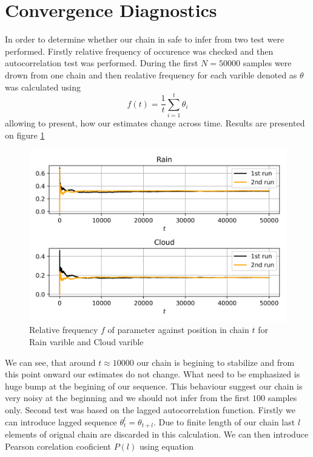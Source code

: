 \documentclass[12pt,a4paper]{article}
\begin{document}
\section{Convergence Diagnostics}
In order to determine whether our chain in safe to infer from two test were performed. Firstly relative frequency of occurence was checked and then 
autocorrelation test was performed. During the first $N=50000$ samples were drown from one chain and then realative frequency for each varible denoted as $\theta$ was calculated using
\begin{equation*}
    f(t)=\frac{1}{t}\sum_{i=1}^{t}\theta_i
\end{equation*} allowing to present, how our estimates change across time. Results are presented on figure \ref{plot_5}
\begin{figure}[H]
    \begin{center}
    \includegraphics{plot_5.png}
    \end{center}
    \caption{Relative frequency $f$ of parameter against position in chain $t$ for Rain varible and Cloud varible}\label{plot_5}
\end{figure}
We can see, that around $t\approx 10000$ our chain is begining to stabilize and from this point onward our estimates do not change. What need to be emphasized is huge 
bump at the begining of our sequence. This behaviour suggest our chain is very noisy at the beginning and we should not infer from the first $100$ samples only.
Second test was based on the lagged autocorrelation function. Firstly we can introduce lagged sequence $\theta^{l}_t=\theta_{t+l}$. Due to finite length of our chain last $l$ 
elements of orignal chain are discarded in this calculation. We can then introduce Pearson corelation cooficient $P(l)$ using equation
\end{document}
